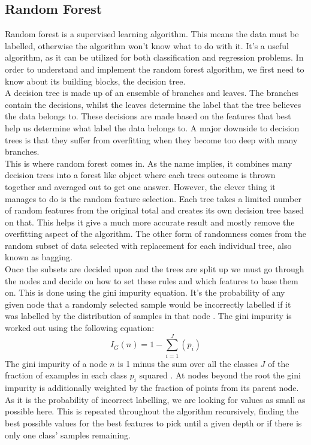 \subsection{Random Forest}
Random forest is a supervised learning algorithm. This means the data must be labelled, otherwise the algorithm won't know what to do with it. It's a useful algorithm, as it can be utilized for both classification and regression problems. In order to understand and implement the random forest algorithm, we first need to know about its building blocks, the decision tree.\\ 
A decision tree is made up of an ensemble of branches and leaves. The branches contain the decisions, whilst the leaves determine the label that the tree believes the data belongs to. These decisions are made based on the features that best help us determine what label the data belongs to. A major downside to decision trees is that they suffer from overfitting when they become too deep with many branches.\\ 
This is where random forest comes in. As the name implies, it combines many decision trees into a forest like object where each trees outcome is thrown together and averaged out to get one answer. However, the clever thing it manages to do is the random feature selection. Each tree takes a limited number of random features from the original total and creates its own decision tree based on that. This helps it give a much more accurate result and mostly remove the overfitting aspect of the algorithm. The other form of randomness comes from the random subset of data selected with replacement for each individual tree, also known as bagging.\\
Once the subsets are decided upon and the trees are split up we must go through the nodes and decide on how to set these rules and which features to base them on. This is done using the gini impurity equation. It's the probability of any given node that a randomly selected sample would be incorrectly labelled if it was labelled by the distribution of samples in that node \cite{DataScience001}.
The gini impurity is worked out using the following equation:
\begingroup
\fontsize{20pt}{10pt}
$$ I_{G}(n) = 1 - \sum_{i=1}^{J}(p_{i}) $$
\endgroup
The gini impurity of a node $n$ is 1 minus the sum over all the classes $J$ of the fraction of examples in each class $p_{i}$ squared \cite{DataScience001}. At nodes beyond the root the gini impurity is additionally weighted by the fraction of points from its parent node. As it is the probability of incorrect labelling, we are looking for values as small as possible here. This is repeated throughout the algorithm recursively, finding the best possible values for the best features to pick until a given depth or if there is only one class' samples remaining. 
